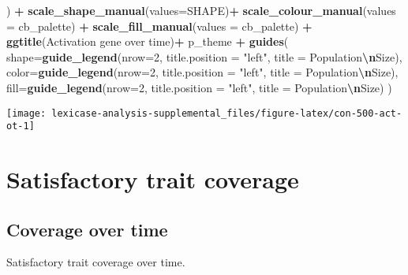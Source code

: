 \documentclass[
]{book}
\newenvironment{Shaded}{\begin{snugshade}}{\end{snugshade}}
\newcommand{\AttributeTok}[1]{\textcolor[rgb]{0.13,0.29,0.53}{#1}}
\newcommand{\DecValTok}[1]{\textcolor[rgb]{0.00,0.00,0.81}{#1}}
\newcommand{\FunctionTok}[1]{\textcolor[rgb]{0.13,0.29,0.53}{\textbf{#1}}}
\newcommand{\NormalTok}[1]{#1}
\newcommand{\SpecialCharTok}[1]{\textcolor[rgb]{0.81,0.36,0.00}{\textbf{#1}}}
\newcommand{\StringTok}[1]{\textcolor[rgb]{0.31,0.60,0.02}{#1}}
\begin{document}
\begin{Shaded}
\begin{Highlighting}[]
\NormalTok{  ) }\SpecialCharTok{+}
  \FunctionTok{scale\_shape\_manual}\NormalTok{(}\AttributeTok{values=}\NormalTok{SHAPE)}\SpecialCharTok{+}
  \FunctionTok{scale\_colour\_manual}\NormalTok{(}\AttributeTok{values =}\NormalTok{ cb\_palette) }\SpecialCharTok{+}
  \FunctionTok{scale\_fill\_manual}\NormalTok{(}\AttributeTok{values =}\NormalTok{ cb\_palette) }\SpecialCharTok{+}
  \FunctionTok{ggtitle}\NormalTok{(}\StringTok{\textquotesingle{}Activation gene over time\textquotesingle{}}\NormalTok{)}\SpecialCharTok{+}
\NormalTok{  p\_theme }\SpecialCharTok{+}
  \FunctionTok{guides}\NormalTok{(}
    \AttributeTok{shape=}\FunctionTok{guide\_legend}\NormalTok{(}\AttributeTok{nrow=}\DecValTok{2}\NormalTok{, }\AttributeTok{title.position =} \StringTok{"left"}\NormalTok{, }\AttributeTok{title =} \StringTok{\textquotesingle{}Population}\SpecialCharTok{\textbackslash{}n}\StringTok{Size\textquotesingle{}}\NormalTok{),}
    \AttributeTok{color=}\FunctionTok{guide\_legend}\NormalTok{(}\AttributeTok{nrow=}\DecValTok{2}\NormalTok{, }\AttributeTok{title.position =} \StringTok{"left"}\NormalTok{, }\AttributeTok{title =} \StringTok{\textquotesingle{}Population}\SpecialCharTok{\textbackslash{}n}\StringTok{Size\textquotesingle{}}\NormalTok{),}
    \AttributeTok{fill=}\FunctionTok{guide\_legend}\NormalTok{(}\AttributeTok{nrow=}\DecValTok{2}\NormalTok{, }\AttributeTok{title.position =} \StringTok{"left"}\NormalTok{, }\AttributeTok{title =} \StringTok{\textquotesingle{}Population}\SpecialCharTok{\textbackslash{}n}\StringTok{Size\textquotesingle{}}\NormalTok{)}
\NormalTok{  )}
\end{Highlighting}
\end{Shaded}

\texttt{[image: lexicase-analysis-supplemental\_files/figure-latex/con-500-act-ot-1]}

\hypertarget{satisfactory-trait-coverage-4}{%
\section{Satisfactory trait coverage}\label{satisfactory-trait-coverage-4}}

\hypertarget{coverage-over-time-9}{%
\subsection{Coverage over time}\label{coverage-over-time-9}}

Satisfactory trait coverage over time.
\end{document}
